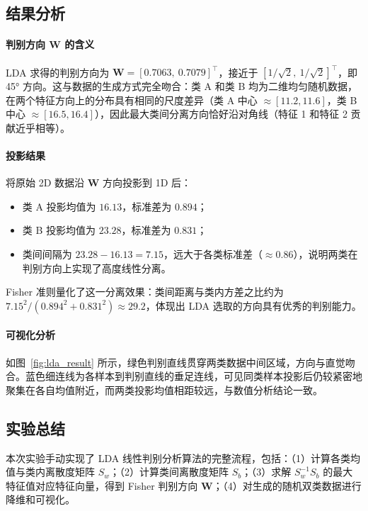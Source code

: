 \documentclass[10.5pt]{config}
\begin{document}
\subsection{结果分析}

\paragraph{判别方向 W 的含义}
LDA 求得的判别方向为 $\mathbf{W} = [0.7063,\ 0.7079]^\top$，接近于 $[1/\sqrt{2},\ 1/\sqrt{2}]^\top$，即 45° 方向。这与数据的生成方式完全吻合：类 A 和类 B 均为二维均匀随机数据，在两个特征方向上的分布具有相同的尺度差异（类 A 中心 $\approx [11.2, 11.6]$，类 B 中心 $\approx [16.5, 16.4]$），因此最大类间分离方向恰好沿对角线（特征 1 和特征 2 贡献近乎相等）。

\paragraph{投影结果}
将原始 2D 数据沿 $\mathbf{W}$ 方向投影到 1D 后：
\begin{itemize}
    \item 类 A 投影均值为 $16.13$，标准差为 $0.894$；
    \item 类 B 投影均值为 $23.28$，标准差为 $0.831$；
    \item 类间间隔为 $23.28 - 16.13 = 7.15$，远大于各类标准差（$\approx 0.86$），说明两类在判别方向上实现了高度线性分离。
\end{itemize}

Fisher 准则量化了这一分离效果：类间距离与类内方差之比约为 $7.15^2 / (0.894^2 + 0.831^2) \approx 29.2$，体现出 LDA 选取的方向具有优秀的判别能力。

\paragraph{可视化分析}
如图~\ref{fig:lda_result} 所示，绿色判别直线贯穿两类数据中间区域，方向与直觉吻合。蓝色细连线为各样本到判别直线的垂足连线，可见同类样本投影后仍较紧密地聚集在各自均值附近，而两类投影均值相距较远，与数值分析结论一致。

\subsection{实验总结}

本次实验手动实现了 LDA 线性判别分析算法的完整流程，包括：（1）计算各类均值与类内离散度矩阵 $S_w$；（2）计算类间离散度矩阵 $S_b$；（3）求解 $S_w^{-1}S_b$ 的最大特征值对应特征向量，得到 Fisher 判别方向 $\mathbf{W}$；（4）对生成的随机双类数据进行降维和可视化。
\end{document}
